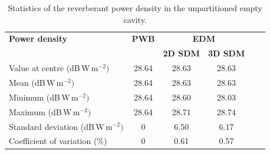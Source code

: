 \documentclass[a4paper]{article}
\numberwithin{equation}{section}
\begin{document}
\begin{table}[ht]
\begin{center}
\begin{tabular}{|l|c|c|c|c|c|}
\hline
\textbf{Power density}               &\textbf{PWB} &\multicolumn{2}{|c|}{\textbf{EDM}} \\ \cline{3-4}
{}                                   &{}           &\textbf{2D SDM} &\textbf{3D SDM}  \\
\hline
Value at centre (dB\,W\,m$^{-2})$    &28.64        &28.63           &28.63 \\
Mean (dB\,W\,m$^{-2})$               &28.64        &28.63           &28.63 \\
Minimum (dB\,W\,m$^{-2})$            &28.64        &28.60           &28.03 \\
Maximum (dB\,W\,m$^{-2})$            &28.64        &28.71           &28.74 \\
Standard deviation (dB\,W\,m$^{-2})$ &0            &6.50            &6.17  \\
Coefficient of variation (\%)        &0            &0.61            &0.57  \\
\hline
\end{tabular}
\end{center}
\caption{\label{tb:unpartempty} Statistics of the reverberant power density in the unpartitioned empty cavity.}
\end{table}
\end{document}
